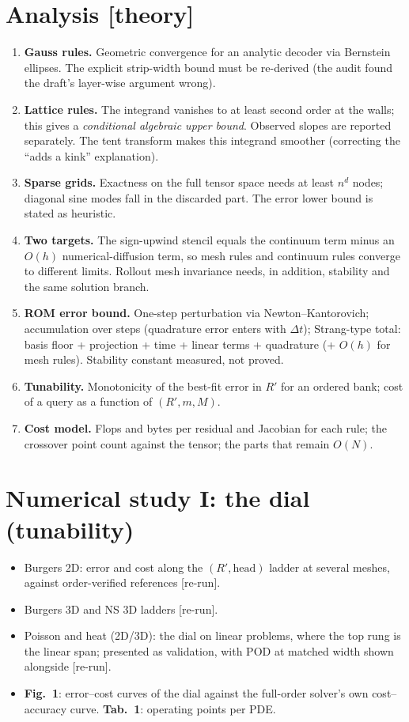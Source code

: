 \documentclass[11pt]{article}
\newcommand{\rerun}{\textsf{\small\textcolor{BurntOrange}{[re-run]}}}
\newcommand{\thy}{\textsf{\small\textcolor{RoyalPurple}{[theory]}}}
\newcommand{\fig}[1]{\textbf{Fig.~#1}}
\newcommand{\tab}[1]{\textbf{Tab.~#1}}
\begin{document}
\section{Analysis \thy}
\begin{enumerate}[label=\arabic*.]
\item \textbf{Gauss rules.} Geometric convergence for an analytic decoder via Bernstein ellipses. The explicit strip-width bound must be re-derived (the audit found the draft's layer-wise argument wrong).
\item \textbf{Lattice rules.} The integrand vanishes to at least second order at the walls; this gives a \emph{conditional algebraic upper bound}. Observed slopes are reported separately. The tent transform makes this integrand smoother (correcting the ``adds a kink'' explanation).
\item \textbf{Sparse grids.} Exactness on the full tensor space needs at least $n^d$ nodes; diagonal sine modes fall in the discarded part. The error lower bound is stated as heuristic.
\item \textbf{Two targets.} The sign-upwind stencil equals the continuum term minus an $O(h)$ numerical-diffusion term, so mesh rules and continuum rules converge to different limits. Rollout mesh invariance needs, in addition, stability and the same solution branch.
\item \textbf{ROM error bound.} One-step perturbation via Newton--Kantorovich; accumulation over steps (quadrature error enters with $\Delta t$); Strang-type total: basis floor + projection + time + linear terms + quadrature (+ $O(h)$ for mesh rules). Stability constant measured, not proved.
\item \textbf{Tunability.} Monotonicity of the best-fit error in $R'$ for an ordered bank; cost of a query as a function of $(R',m,M)$.
\item \textbf{Cost model.} Flops and bytes per residual and Jacobian for each rule; the crossover point count against the tensor; the parts that remain $O(N)$.
\end{enumerate}

\section{Numerical study I: the dial (tunability)}
\begin{itemize}
\item Burgers 2D: error and cost along the $(R',\text{head})$ ladder at several meshes, against order-verified references \rerun.
\item Burgers 3D and NS 3D ladders \rerun.
\item Poisson and heat (2D/3D): the dial on linear problems, where the top rung is the linear span; presented as validation, with POD at matched width shown alongside \rerun.
\item \fig{1}: error--cost curves of the dial against the full-order solver's own cost--accuracy curve. \tab{1}: operating points per PDE.
\end{itemize}
\end{document}
